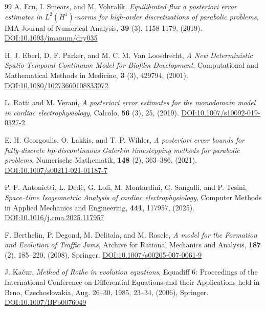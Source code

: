 \documentclass[review,11pt]{article}
\numberwithin{equation}{section}
\begin{document}
\begin{thebibliography}{99}
A. Ern, I. Smears, and M. Vohral\'ik, \emph{Equilibrated flux a posteriori error estimates in ${L}^{2}({H}^{1})$-norms for high-order discretizations of parabolic problems}, IMA Journal of Numerical Analysis, \textbf{39} (3), 1158-1179, (2019). \href{https://doi.org/10.1093/imanum/dry035}
{DOI:10.1093/imanum/dry035}

H. J. Eberl, D. F. Parker, and M. C. M. {Van Loosdrecht}, \emph{A New Deterministic {Spatio-Temporal} {Continuum} {Model} for {Biofilm} {Development}}, Computational and Mathematical Methods in Medicine, \textbf{3} (3), 429794, (2001). \href{https://doi.org/10.1080/10273660108833072}{DOI:10.1080/10273660108833072}


L. Ratti and M. Verani, \emph{A posteriori error estimates for the 
monodomain model in cardiac 
electrophysiology}, Calcolo, \textbf{56} (3), 25, (2019). \href{https://doi.org/10.1007/s10092-019-0327-2}
{DOI:10.1007/s10092-019-0327-2}


E. H. Georgoulis, O. Lakkis, and T. P. Wihler, \emph{A posteriori error bounds for 
fully-discrete $hp$-discontinuous 
{G}alerkin timestepping methods for 
parabolic problems}, Numerische Mathematik, \textbf{148} (2), 363--386, (2021). \href{https://doi.org/10.1007/s00211-021-01187-7}
{DOI:10.1007/s00211-021-01187-7}

P. F. Antonietti, L. Ded\`e, G. Loli, M. Montardini, G. Sangalli, and P. Tesini, \emph{Space--time {Isogeometric Analysis} of cardiac electrophysiology}, Computer Methods in Applied Mechanics and Engineering, \textbf{441}, 117957, (2025). \href{https://doi.org/10.1016/j.cma.2025.117957}{DOI:10.1016/j.cma.2025.117957}


F. Berthelin, P. Degond, M. Delitala, and M. Rascle, \emph{{A model} for the {Formation} and {Evolution} of {Traffic Jams}}, Archive for Rational Mechanics and Analysis, \textbf{187} (2), 185--220, (2008), Springer. \href{ https://doi.org/10.1007/s00205-007-0061-9}
{DOI:10.1007/s00205-007-0061-9}


J. Ka{\v{c}}ur, \emph{{Method of Rothe in evolution equations}}, Equadiff 6: Proceedings of the International Conference on Differential Equations and their Applications held in Brno, Czechoslovakia, Aug. 26--30, 1985, 23--34, (2006), Springer. \href{https://doi.org/10.1007/BFb0076049}{DOI:10.1007/BFb0076049}


\end{thebibliography}
\end{document}

